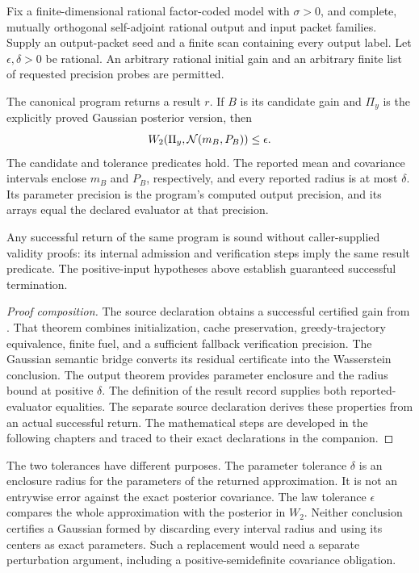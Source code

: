 \begin{theorem}\label{thm:publication-contract}
Fix a finite-dimensional rational factor-coded model with $\sigma>0$, and complete, mutually orthogonal self-adjoint rational output and input packet families. Supply an output-packet seed and a finite scan containing every output label. Let $\epsilon,\delta>0$ be rational. An arbitrary rational initial gain and an arbitrary finite list of requested precision probes are permitted.

The canonical program  returns a result $r$. If $B$ is its candidate gain and $\Pi_y$ is the explicitly proved Gaussian posterior version, then
\[
W_2(\Pi_y,\mathcal N(m_B,P_B))\leq\epsilon.
\]
The candidate and tolerance predicates hold. The reported mean and covariance intervals enclose $m_B$ and $P_B$, respectively, and every reported radius is at most $\delta$. Its parameter precision is the program's computed output precision, and its arrays equal the declared evaluator at that precision.

Any successful return of the same program is sound without caller-supplied validity proofs: its internal admission and verification steps imply the same result predicate. The positive-input hypotheses above establish guaranteed successful termination.
\end{theorem}
\begin{proof}[Proof composition]
The source declaration  obtains a successful certified gain from . That theorem combines initialization, cache preservation, greedy-trajectory equivalence, finite fuel, and a sufficient fallback verification precision. The Gaussian semantic bridge converts its residual certificate into the Wasserstein conclusion. The output theorem  provides parameter enclosure and the radius bound at positive $\delta$. The definition of the result record supplies both reported-evaluator equalities. The separate source declaration  derives these properties from an actual successful return. The mathematical steps are developed in the following chapters and traced to their exact declarations in the companion.
\end{proof}

The two tolerances have different purposes. The parameter tolerance $\delta$ is an enclosure radius for the parameters of the returned approximation. It is not an entrywise error against the exact posterior covariance. The law tolerance $\epsilon$ compares the whole approximation with the posterior in $W_2$. Neither conclusion certifies a Gaussian formed by discarding every interval radius and using its centers as exact parameters. Such a replacement would need a separate perturbation argument, including a positive-semidefinite covariance obligation.

